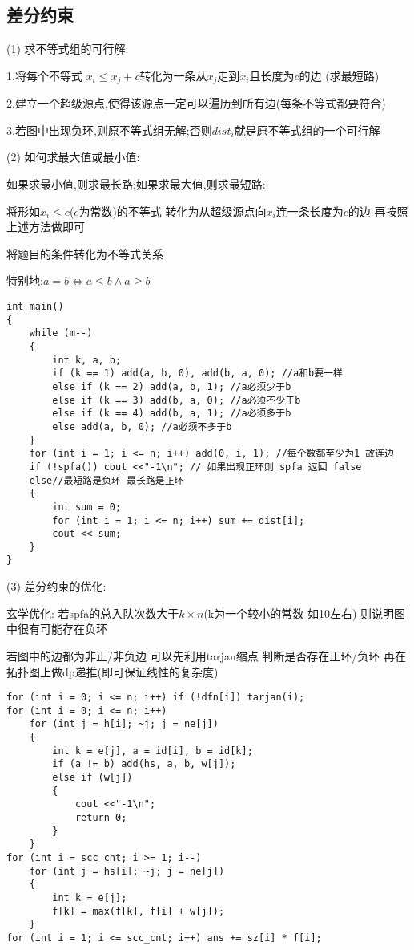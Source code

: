 \documentclass[a4paper, fontset=none]{ctexart}
\begin{document}
\subsection{差分约束}
(1) 求不等式组的可行解:

1.将每个不等式 $x_i\leqslant x_j+c$转化为一条从$x_j$走到$x_i$且长度为$c$的边 (求最短路)

2.建立一个超级源点,使得该源点一定可以遍历到所有边(每条不等式都要符合)

3.若图中出现负环,则原不等式组无解;否则$dist_i$就是原不等式组的一个可行解

(2) 如何求最大值或最小值:

如果求最小值,则求最长路;如果求最大值,则求最短路:

将形如$x_i\leqslant c$($c$为常数)的不等式 转化为从超级源点向$x_i$连一条长度为$c$的边 再按照上述方法做即可

将题目的条件转化为不等式关系

特别地:$a=b\Leftrightarrow a\leqslant b\land a\geqslant b$

\begin{verbatim}
int main()
{
    while (m--)
    {
        int k, a, b;
        if (k == 1) add(a, b, 0), add(b, a, 0); //a和b要一样
        else if (k == 2) add(a, b, 1); //a必须少于b
        else if (k == 3) add(b, a, 0); //a必须不少于b
        else if (k == 4) add(b, a, 1); //a必须多于b
        else add(a, b, 0); //a必须不多于b
    }
    for (int i = 1; i <= n; i++) add(0, i, 1); //每个数都至少为1 故连边
    if (!spfa()) cout <<"-1\n"; // 如果出现正环则 spfa 返回 false
    else//最短路是负环 最长路是正环
    {
        int sum = 0;
        for (int i = 1; i <= n; i++) sum += dist[i];
        cout << sum;
    }
}
\end{verbatim}

(3) 差分约束的优化:

玄学优化: 若spfa的总入队次数大于$k\times n$(k为一个较小的常数 如10左右)  则说明图中很有可能存在负环

若图中的边都为非正/非负边  可以先利用tarjan缩点 判断是否存在正环/负环 再在拓扑图上做dp递推(即可保证线性的复杂度)

\begin{verbatim}
for (int i = 0; i <= n; i++) if (!dfn[i]) tarjan(i);
for (int i = 0; i <= n; i++)
    for (int j = h[i]; ~j; j = ne[j])
    {
        int k = e[j], a = id[i], b = id[k];
        if (a != b) add(hs, a, b, w[j]);
        else if (w[j])
        {
            cout <<"-1\n";
            return 0;
        }
    }
for (int i = scc_cnt; i >= 1; i--)
    for (int j = hs[i]; ~j; j = ne[j])
    {
        int k = e[j];
        f[k] = max(f[k], f[i] + w[j]);
    }
for (int i = 1; i <= scc_cnt; i++) ans += sz[i] * f[i];
\end{verbatim}
\end{document}
